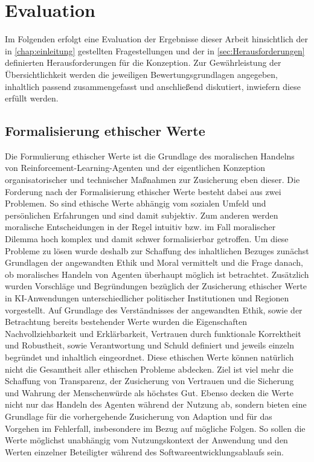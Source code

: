 \chapter{Evaluation}\label{chap:evaluation}
Im Folgenden erfolgt eine Evaluation der Ergebnisse dieser Arbeit hinsichtlich der in \autoref{chap:einleitung} gestellten Fragestellungen und der in \autoref{sec:Herausforderungen} definierten Herausforderungen für die Konzeption.
Zur Gewährleistung der Übersichtlichkeit werden die jeweiligen Bewertungsgrundlagen angegeben, inhaltlich passend zusammengefasst und anschließend diskutiert, inwiefern diese erfüllt werden.

\section{Formalisierung ethischer Werte}
Die Formulierung ethischer Werte ist die Grundlage des moralischen Handelns von Reinforcement-Learning-Agenten und der eigentlichen Konzeption organisatorischer und technischer Maßnahmen zur Zusicherung eben dieser.
Die Forderung nach der Formalisierung ethischer Werte besteht dabei aus zwei Problemen.
So sind ethische Werte abhängig vom sozialen Umfeld und persönlichen Erfahrungen und sind damit subjektiv.
Zum anderen werden moralische Entscheidungen in der Regel intuitiv bzw. im Fall moralischer Dilemma hoch komplex und damit schwer formalisierbar getroffen.
\ab 
Um diese Probleme zu lösen wurde deshalb zur Schaffung des inhaltlichen Bezuges zunächst Grundlagen der angewandten Ethik und Moral vermittelt und die Frage danach, ob moralisches Handeln von Agenten überhaupt möglich ist betrachtet.
Zusätzlich wurden Vorschläge und Begründungen bezüglich der Zusicherung ethischer Werte in KI-Anwendungen unterschiedlicher politischer Institutionen und Regionen vorgestellt.
Auf Grundlage des Verständnisses der angewandten Ethik, sowie der Betrachtung bereits bestehender Werte wurden die Eigenschaften Nachvollziehbarkeit und Erklärbarkeit, Vertrauen durch funktionale Korrektheit und Robustheit, sowie Verantwortung und Schuld definiert und jeweils einzeln begründet und inhaltlich eingeordnet.
Diese ethischen Werte können natürlich nicht die Gesamtheit aller ethischen Probleme abdecken.
Ziel ist viel mehr die Schaffung von Transparenz, der Zusicherung von Vertrauen und die Sicherung und Wahrung der Menschenwürde als höchstes Gut.
Ebenso decken die Werte nicht nur das Handeln des Agenten während der Nutzung ab, sondern bieten eine Grundlage für die vorhergehende Zusicherung von Adaption und für das Vorgehen im Fehlerfall, insbesondere im Bezug auf mögliche Folgen.
So sollen die Werte möglichst unabhängig vom Nutzungskontext der Anwendung und den Werten einzelner Beteiligter während des Softwareentwicklungsablaufs sein.

